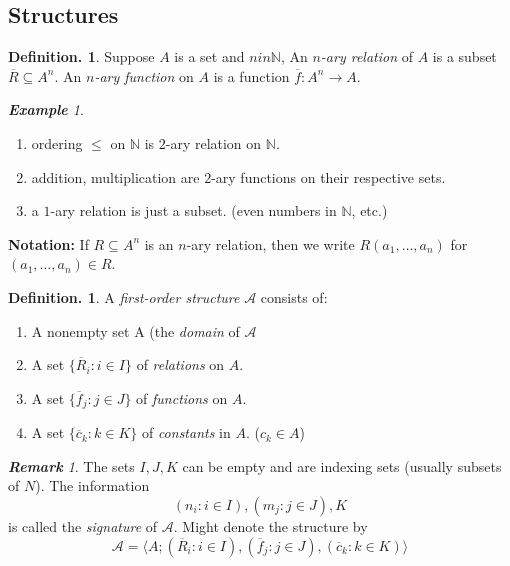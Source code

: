 \documentclass[a4paper,oneside,11pt,DIV=12,parskip=half]{scrartcl}
\newcommand{\N}{\mathbb N}
\theoremstyle{plain}
\theoremstyle{definition}
\newtheorem{definition}[theorem]{Definition.}
\newtheorem{remark, definition}[theorem]{Remark and Definition.}
\newtheorem{lemma, definition}[theorem]{Lemma and Definition.}
\newtheorem{theorem, definition}[theorem]{Theorem and Definition.}
\theoremstyle{remark}
\newtheorem*{remark}{\textbf{Remark}}
\newtheorem*{example}{\textbf{Example}}
\newtheorem*{remark, example}{\textbf{Remark and Exercise}}
\begin{document}
\subsection{Structures}

\begin{definition}
    Suppose $A$ is a set and $n in \N$, An \emph{$n$-ary relation} of $A$ is a subset $\overline{R} \subseteq A^n$.
    An \emph{$n$-ary function} on $A$ is a function $\overline{f}: A^n \rightarrow A$.
\end{definition}

\begin{example}
\begin{enumerate}
    \item ordering $\leq$ on $\N$ is $2$-ary relation on $\N$.
    \item addition, multiplication are $2$-ary functions on their respective sets.
    \item a $1$-ary relation is just a subset. (even numbers in $\N$, etc.)
\end{enumerate}

\textbf{Notation:} If $R \subseteq A^n$ is an $n$-ary relation, then we write $R(a_1,\dots,a_n)$ for $(a_1,\dots,a_n) \in R$.

\begin{definition}
    A \emph{first-order structure} $\mathcal{A}$ consists of:
    \begin{enumerate}
        \item A nonempty set A (the \emph{domain} of $\mathcal{A}$
        \item A set $\{\overline{R}_i:i \in I \}$ of \emph{relations} on $A$.
        \item A set $\{\overline{f}_j:j \in J \}$ of \emph{functions} on $A$.
        \item A set $\{\overline{c}_k:k \in K \}$ of \emph{constants} in $A$. ($c_k \in A$)
    \end{enumerate}
\end{definition}
\begin{remark}
The sets $I,J,K$ can be empty and are indexing sets (usually subsets of $N$).
The information 
\[ (n_i : i \in I), (m_j : j \in J), K \] is called the \emph{signature} of $\mathcal{A}$.
Might denote the structure by
\[ \mathcal{A}=\langle A; (\overline{R}_i : i \in I), (\overline{f}_j : j \in J), (\overline{c}_k : k \in K) \rangle \]
\end{remark}
\end{example}
\end{document}
